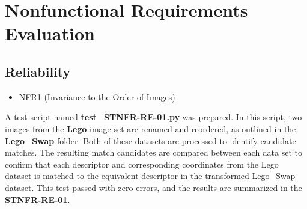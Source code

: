 \documentclass[12pt, titlepage]{article}
\begin{document}
\section{Nonfunctional Requirements Evaluation}
\subsection{Reliability}
\begin{itemize}
  \item NFR1 (Invariance to the Order of Images)
  \end{itemize}
A test script named \href{https://github.com/KiranSingh15/CAS-741-Image-Correspondences/blob/main/src/tests/test_STNFR-RE-01.py}{\textbf{test\_STNFR-RE-01.py}} was prepared. In this script, two images from the \href{https://github.com/KiranSingh15/CAS-741-Image-Correspondences/tree/main/src/tests/testImages/lego}{\textbf{Lego}} image set are renamed and reordered, as outlined in the \href{https://github.com/KiranSingh15/CAS-741-Image-Correspondences/tree/main/src/tests/testImages/lego_swap}{\textbf{Lego\_Swap}} folder. Both of these datasets are processed to identify candidate matches. The resulting match candidates are compared between each data set to confirm that each descriptor and corresponding coordinates from the Lego dataset is matched to the equivalent descriptor in the transformed Lego\_Swap dataset. This test passed with zero errors, and the results are summarized in the \href{https://github.com/KiranSingh15/CAS-741-Image-Correspondences/tree/main/src/tests/Outputs/2025-04-13_15-19-26}{\textbf{STNFR-RE-01}}.
\end{document}
